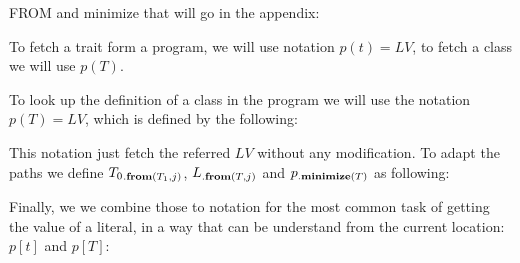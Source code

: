 FROM and minimize that will go in the appendix:

To fetch a trait form a program, we will use notation $p(t)=LV$, to 
fetch a class we will use $p(T)$.

To look up the definition of a class in the program we will use the notation
$p(T)=\textit{LV}$, which is defined by the following:%
\noindent
\begin{defye}%
%
%
%
%
%
\end{defye}


This notation just fetch the referred $LV$ without any modification.
To adapt the paths we define $T_0{{}_{.\textbf{from}({T_1,j})}}$, $L{{}_{.\textbf{from}({T,j})}}$ and $p{{}_{.\textbf{minimize}({T})}}$ as following:
\begin{defye}%
%
%
%
%
%
\end{defye}

\noindent Finally, we we combine those to notation for the
most common task of getting the value of a literal, in a way that can be understand from the current location: $p[t]$ and $p[T]$:
\begin{defye}%
\end{defye}
\\${}_{}$\\
